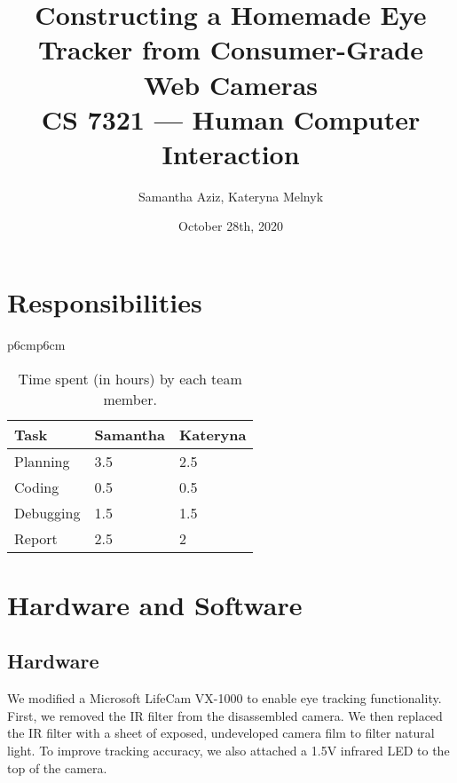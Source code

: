\documentclass[11pt]{article}
\begin{document}
\title{Constructing a Homemade Eye Tracker from Consumer-Grade Web Cameras \\
CS 7321 — Human Computer Interaction}
\author{Samantha Aziz, Kateryna Melnyk}  %
\date{October 28th, 2020}
\maketitle

\section{Responsibilities}
\label{sec:responsibilities} %

    \begin{table}[h!]
        \begin{center}
        \begin{tabular}{p{6cm}p{6cm}}
            \begin{tabular}{lll}
            \toprule
            Task & Samantha & Kateryna \\
            \midrule
            Planning & 3.5 & 2.5 \\
            \midrule
            Coding & 0.5 & 0.5 \\
            \midrule
            Debugging & 1.5 & 1.5 \\
            \midrule
            Report & 2.5 & 2 \\
            \bottomrule
            \end{tabular}
        \end{tabular}
        \caption{Time spent (in hours) by each team member.}
        \end{center}
        \label{tab:table_repsonsibilities}
    \end{table}

\section{Hardware and Software}
\label{sec:hardware-and-software} %

\label{setup}
\subsection{Hardware}
\label{subsec:hardware}
We modified a Microsoft LifeCam VX-1000 to enable eye tracking functionality.
First, we removed the IR filter from the disassembled camera.
We then replaced the IR filter with a sheet of exposed, undeveloped camera film
to filter natural light.
To improve tracking accuracy, we also attached a 1.5V infrared LED to the top of
the camera. \\
\end{document}
